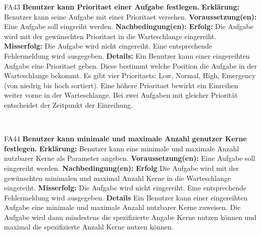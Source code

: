 \documentclass[a4paper,12pt]{article}
\begin{document}
\begin{itemize}[nosep]
	\begin{minipage}[t]{\linewidth}
		\item[FA43] \textbf{Benutzer kann \gls{Prioritaet} einer Aufgabe festlegen.}
		\subitem \textbf{Erklärung:} \gls{Benutzer} kann seine Aufgabe mit einer \gls{Prioritaet} versehen.
		\subitem \textbf{Voraussetzung(en):} Eine Aufgabe soll eingreiht werden.
		\subitem \textbf{Nachbedingung(en):}
		\subsubitem \textbf{Erfolg:} Die Aufgabe wird mit der gewünschten \gls{Prioritaet} in die Warteschlange eingereiht.
		\subsubitem \textbf{Misserfolg:} Die Aufgabe wird nicht eingereiht. Eine entsprechende Fehlermeldung wird ausgegeben.
		\subitem \textbf{Details:} Ein \gls{Benutzer} kann einer eingereihten Aufgabe eine \gls{Prioritaet} geben. Diese bestimmt welche Position die Aufgabe in der Warteschlange bekommt. Es gibt vier \glspl{Prioritaet}: Low, Normal, High, Emergency (von niedrig bis hoch sortiert). Eine höhere \gls{Prioritaet} bewirkt ein Einreihen weiter vorne in der Warteschlange. Bei zwei Aufgaben mit gleicher Priorität entscheidet der Zeitpunkt der Einreihung.
    \end{minipage}	
	\newline
	\\
	
	\begin{minipage}[t]{\linewidth}
		\item[FA44] \textbf{Benutzer kann minimale und maximale Anzahl genutzer Kerne festlegen.}
		\subitem \textbf{Erklärung:} \gls{Benutzer} kann eine minimale und maximale Anzahl nutzbarer Kerne als Parameter angeben.
		\subitem \textbf{Voraussetzung(en):} Eine Aufgabe soll eingereiht werden.
		\subitem \textbf{Nachbedingung(en):}
		\subsubitem \textbf{Erfolg} Die Aufgabe wird mit der gewünschten minimalen und maximal Anzahl Kerne in die Warteschlange eingereiht.
		\subsubitem \textbf{Misserfolg:} Die Aufgabe wird nicht eingereiht. Eine entsprechende Fehlermeldung wird ausgegeben.
		\subitem \textbf{Details} Ein \gls{Benutzer} kann einer eingereihten Aufgabe eine minimale und maximale Anzahl nutzbarer Kerne zuweisen. Die Aufgabe wird dann mindestens die spezifizierte Angabe Kerne nutzen können und maximal die spezifizierte Anzahl Kerne nutzen können.
	\end{minipage}
	\newline
	\\
	

\end{itemize}
\end{document}
